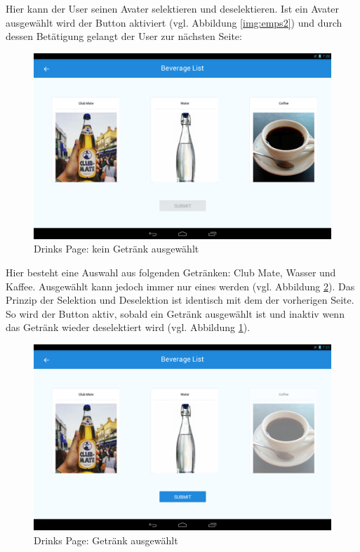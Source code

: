 Hier kann der User seinen Avater selektieren und deselektieren. Ist ein Avater ausgewählt wird der  Button aktiviert (vgl. Abbildung \ref{img:emps2}) und durch dessen Betätigung gelangt der User zur nächsten Seite: 

\begin{figure}[th!]
	\centering
	\includegraphics[width=.9\columnwidth]{./Abbildungen/Kapitel_03/drinks1.png}
	\caption{Drinks Page: kein Getränk ausgewählt}
	\label{img:drinks1}
\end{figure}

Hier besteht eine Auswahl aus folgenden Getränken: Club Mate, Wasser und Kaffee. 
Ausgewählt kann jedoch immer nur eines werden (vgl. Abbildung \ref{img:drinks2}).
Das Prinzip der Selektion und Deselektion ist identisch mit dem der vorherigen Seite. So wird der  Button aktiv, sobald ein Getränk ausgewählt ist und inaktiv wenn das Getränk wieder deselektiert wird (vgl. Abbildung \ref{img:drinks1}).\\

\begin{figure}[th!]
	\centering
	\includegraphics[width=.9\columnwidth]{./Abbildungen/Kapitel_03/drinks2.png}
	\caption{Drinks Page: Getränk ausgewählt}
	\label{img:drinks2}
\end{figure}

